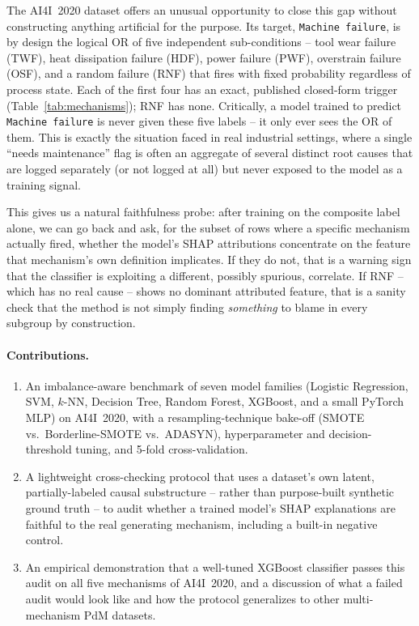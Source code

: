 \documentclass[11pt]{article}
\begin{document}
The AI4I~2020 dataset \citep{matzka2020explainable} offers an unusual opportunity to close this gap
without constructing anything artificial for the purpose. Its target, \texttt{Machine failure}, is
by design the logical OR of five independent sub-conditions -- tool wear failure (TWF), heat
dissipation failure (HDF), power failure (PWF), overstrain failure (OSF), and a random failure
(RNF) that fires with fixed probability regardless of process state. Each of the first four has an
exact, published closed-form trigger (Table~\ref{tab:mechanisms}); RNF has none. Critically, a model
trained to predict \texttt{Machine failure} is never given these five labels -- it only ever sees
the OR of them. This is exactly the situation faced in real industrial settings, where a single
``needs maintenance'' flag is often an aggregate of several distinct root causes that are logged
separately (or not logged at all) but never exposed to the model as a training signal.

This gives us a natural faithfulness probe: after training on the composite label alone, we can go
back and ask, for the subset of rows where a specific mechanism actually fired, whether the model's
SHAP attributions concentrate on the feature that mechanism's own definition implicates. If they do
not, that is a warning sign that the classifier is exploiting a different, possibly spurious,
correlate. If RNF -- which has no real cause -- shows no dominant attributed feature, that is a
sanity check that the method is not simply finding \emph{something} to blame in every subgroup by
construction.

\paragraph{Contributions.}
\begin{enumerate}
  \item An imbalance-aware benchmark of seven model families (Logistic Regression, SVM, $k$-NN,
    Decision Tree, Random Forest, XGBoost, and a small PyTorch MLP) on AI4I~2020, with a
    resampling-technique bake-off (SMOTE vs.\ Borderline-SMOTE vs.\ ADASYN), hyperparameter and
    decision-threshold tuning, and 5-fold cross-validation.
  \item A lightweight cross-checking protocol that uses a dataset's own latent, partially-labeled
    causal substructure -- rather than purpose-built synthetic ground truth -- to audit whether a
    trained model's SHAP explanations are faithful to the real generating mechanism, including a
    built-in negative control.
  \item An empirical demonstration that a well-tuned XGBoost classifier passes this audit on all
    five mechanisms of AI4I~2020, and a discussion of what a failed audit would look like and how
    the protocol generalizes to other multi-mechanism PdM datasets.
\end{enumerate}
\end{document}
